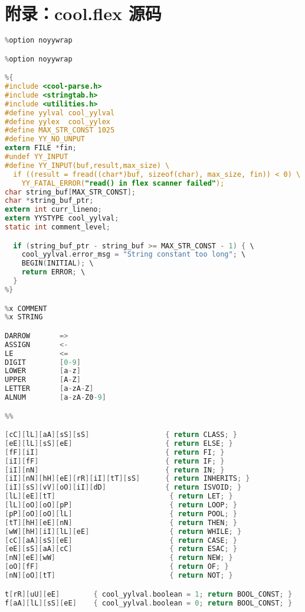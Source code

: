 \documentclass[a4paper,12pt]{article}
\begin{document}
\section{附录：cool.flex 源码}
\begin{lstlisting}[language=C]
%option noyywrap
%option noyywrap

%option noyywrap

%{
#include <cool-parse.h>
#include <stringtab.h>
#include <utilities.h>
#define yylval cool_yylval
#define yylex  cool_yylex
#define MAX_STR_CONST 1025
#define YY_NO_UNPUT
extern FILE *fin;
#undef YY_INPUT
#define YY_INPUT(buf,result,max_size) \
  if ((result = fread((char*)buf, sizeof(char), max_size, fin)) < 0) \
    YY_FATAL_ERROR("read() in flex scanner failed");
char string_buf[MAX_STR_CONST];
char *string_buf_ptr;
extern int curr_lineno;
extern YYSTYPE cool_yylval;
static int comment_level;

  if (string_buf_ptr - string_buf >= MAX_STR_CONST - 1) { \
    cool_yylval.error_msg = "String constant too long"; \
    BEGIN(INITIAL); \
    return ERROR; \
  }
%}

%x COMMENT
%x STRING

DARROW       =>
ASSIGN       <-
LE           <=
DIGIT        [0-9]
LOWER        [a-z]
UPPER        [A-Z]
LETTER       [a-zA-Z]
ALNUM        [a-zA-Z0-9]

%%

[cC][lL][aA][sS][sS]                  { return CLASS; }
[eE][lL][sS][eE]                      { return ELSE; }
[fF][iI]                              { return FI; }
[iI][fF]                              { return IF; }
[iI][nN]                              { return IN; }
[iI][nN][hH][eE][rR][iI][tT][sS]      { return INHERITS; }
[iI][sS][vV][oO][iI][dD]              { return ISVOID; }
[lL][eE][tT]                           { return LET; }
[lL][oO][oO][pP]                       { return LOOP; }
[pP][oO][oO][lL]                       { return POOL; }
[tT][hH][eE][nN]                       { return THEN; }
[wW][hH][iI][lL][eE]                   { return WHILE; }
[cC][aA][sS][eE]                       { return CASE; }
[eE][sS][aA][cC]                       { return ESAC; }
[nN][eE][wW]                           { return NEW; }
[oO][fF]                               { return OF; }
[nN][oO][tT]                           { return NOT; }

t[rR][uU][eE]        { cool_yylval.boolean = 1; return BOOL_CONST; }
f[aA][lL][sS][eE]    { cool_yylval.boolean = 0; return BOOL_CONST; }


\end{lstlisting}
\end{document}
